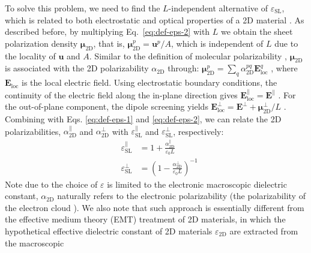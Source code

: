 \documentclass[journal=ancac3,manuscript=article,email=true,hyperref=true,keywords=false]{achemso}
\begin{document}
To solve this problem, we need to find the $L$-independent alternative
of $\varepsilon_{\mathrm{SL}}$, which is related to both electrostatic
and optical properties of a 2D material \cite{Matthes_2016}. As
described before, by multiplying Eq.~\ref{eq:def-eps-2} with $L$ we
obtain the sheet polarization density
$\boldsymbol{\mu}_{\mathrm{2D}}$, that is,
$\boldsymbol{\mu}_{\mathrm{2D}}^{p} =\boldsymbol{u}^{p}/A$, which is
independent of $L$ due to the locality of $\boldsymbol{u}$ and $A$.
%
Similar to the definition of molecular polarizability
\cite{Israelachvili_2011}, $\boldsymbol{\mu}_{\mathrm{2D}}$ is
associated with the 2D polarizability $\alpha_{\mathrm{2D}}$ through:
$\boldsymbol{\mu}_{\mathrm{2D}}^{p} = \sum_{q}
\alpha_{\mathrm{2D}}^{pq} \boldsymbol{E}_{\mathrm{loc}}^{q}$
\cite{T_bik_2004}, where $\boldsymbol{E}_{\mathrm{loc}}$ is the local
electric field. Using electrostatic boundary conditions, the
continuity of the electric field along the in-plane direction gives
$\boldsymbol{E}^{\parallel}_{\mathrm{loc}}=\boldsymbol{E}^{\parallel}$
\cite{Markel_2016}. For the out-of-plane component, the dipole
screening yields
$\boldsymbol{E}_{\mathrm{loc}}^{\perp}=\boldsymbol{E}^{\perp}+\boldsymbol{\mu}_{\mathrm{2D}}^{\perp}/L$
\cite{Meyer_2001_dipole_slab,T_bik_2004}. Combining with
Eqs. \ref{eq:def-eps-1} and \ref{eq:def-eps-2}, we can relate the 2D
polarizabilities, $\alpha_{\mathrm{2D}}^{\parallel}$ and
$\alpha_{\mathrm{2D}}^{\perp}$ with
$\varepsilon_{\mathrm{SL}}^{\parallel}$ and
$\varepsilon_{\mathrm{SL}}^{\perp}$, respectively:
%
%
\begin{subequations}
\begin{eqnarray}
  \label{eq:alpha-para-def}
  &\varepsilon_{\mathrm{SL}}^{\parallel} &= 1 + \frac{\alpha_{\mathrm{2D}}^{\parallel}}{\varepsilon_{0}L}\\
  \label{eq:alpha-perp-def}
  &\varepsilon_{\mathrm{SL}}^{\perp} &= \left(1 - {\displaystyle \frac{\alpha_{\mathrm{2D}}^{\perp}}{\varepsilon_{\mathrm{0}} L}} \right)^{-1}
\end{eqnarray}
\end{subequations}
Note due to the choice of $\varepsilon$ is limited to the electronic
macroscopic dielectric constant, $\alpha_{\mathrm{2D}}$ naturally
refers to the electronic polarizability (the polarizability of the
electron cloud \cite{Israelachvili_2011}). We also note that such
approach is essentially different from the effective medium theory
(EMT) treatment\cite{Aspnes_1982} of 2D materials, in which the
hypothetical effective dielectric constant of 2D materials
$\varepsilon_{\mathrm{2D}}$ are extracted from the macroscopic
\end{document}
